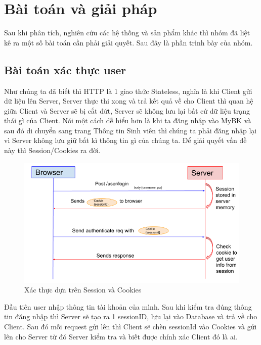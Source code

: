 \chapter{Bài toán và giải pháp}\label{chap:ProblemAndSolve}
		Sau khi phân tích, nghiên cứu các hệ thống và sản phẩm khác thì nhóm đã liệt kê ra một số bài toán cần phải giải quyết. Sau đây là phần trình bày của nhóm.
		
		\section{Bài toán xác thực user}
		Như chúng ta đã biết thì HTTP là 1 giao thức Stateless, nghĩa là khi Client gửi dữ liệu lên Server, Server thực thi xong và trả kết quả về cho Client thì quan hệ giữa Client và Server sẽ bị cắt đứt, Server sẽ không lưu lại bất cứ dữ liệu trạng thái gì của Client. Nói một cách dễ hiểu hơn là khi ta đăng nhập vào MyBK và sau đó di chuyển sang trang Thông tin Sinh viên thì chúng ta phải đăng nhập lại vì Server không lưu giữ bất kì thông tin gì của chúng ta. Để giải quyết vấn đề này thì Session/Cookies ra đời.
		
		\newpage
	
		\begin{figure}[!ht]
			\includegraphics[width=1\textwidth]{Images/session-cookies.png}
			\centering
			\linebreak
			\caption{Xác thực dựa trên Session và Cookies}
		\end{figure}
		
		Đầu tiên user nhập thông tin tài khoản của mình. Sau khi kiểm tra đúng thông tin đăng nhập thì Server sẽ tạo ra 1 sessionID, lưu lại vào Database và trả về cho Client. Sau đó mỗi request gửi lên thì Client sẽ chèn sessionId vào Cookies và gửi lên cho Server từ đó Server kiểm tra và biết được chính xác Client đó là ai.
		
